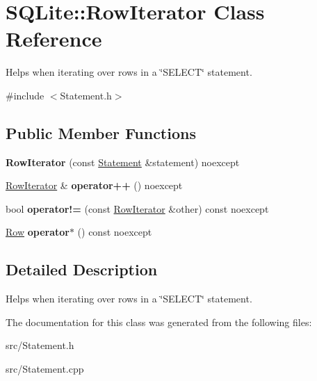 \hypertarget{class_s_q_lite_1_1_row_iterator}{\section{S\-Q\-Lite\-:\-:Row\-Iterator Class Reference}
\label{class_s_q_lite_1_1_row_iterator}
}


Helps when iterating over rows in a \char`\"{}\-S\-E\-L\-E\-C\-T\char`\"{} statement.  




{\ttfamily \#include $<$Statement.\-h$>$}

\subsection*{Public Member Functions}
\begin{DoxyCompactItemize}
\item 
\hypertarget{class_s_q_lite_1_1_row_iterator_ad3927378b109ab3dfd6f86d8326f609c}{{\bfseries Row\-Iterator} (const \hyperlink{class_s_q_lite_1_1_statement}{Statement} \&statement) noexcept}\label{class_s_q_lite_1_1_row_iterator_ad3927378b109ab3dfd6f86d8326f609c}

\item 
\hypertarget{class_s_q_lite_1_1_row_iterator_a55c22680d983bd87d068bb304dbb1508}{\hyperlink{class_s_q_lite_1_1_row_iterator}{Row\-Iterator} \& {\bfseries operator++} () noexcept}\label{class_s_q_lite_1_1_row_iterator_a55c22680d983bd87d068bb304dbb1508}

\item 
\hypertarget{class_s_q_lite_1_1_row_iterator_ab5a2045335ee19bb897381b51b013a48}{bool {\bfseries operator!=} (const \hyperlink{class_s_q_lite_1_1_row_iterator}{Row\-Iterator} \&other) const noexcept}\label{class_s_q_lite_1_1_row_iterator_ab5a2045335ee19bb897381b51b013a48}

\item 
\hypertarget{class_s_q_lite_1_1_row_iterator_a1e27980d666a42f9835c919f8b9c93b1}{\hyperlink{class_s_q_lite_1_1_row}{Row} {\bfseries operator$\ast$} () const noexcept}\label{class_s_q_lite_1_1_row_iterator_a1e27980d666a42f9835c919f8b9c93b1}

\end{DoxyCompactItemize}


\subsection{Detailed Description}
Helps when iterating over rows in a \char`\"{}\-S\-E\-L\-E\-C\-T\char`\"{} statement. 

The documentation for this class was generated from the following files\-:\begin{DoxyCompactItemize}
\item 
src/Statement.\-h\item 
src/Statement.\-cpp\end{DoxyCompactItemize}
